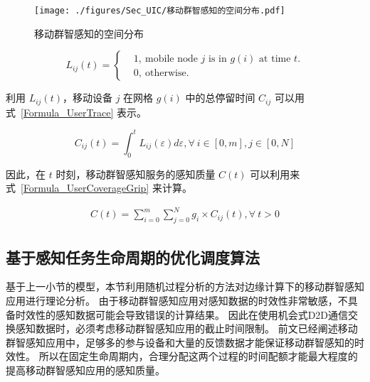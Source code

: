 \begin{figure}[!h]
  \centering
  \texttt{[image: ./figures/Sec\_UIC/移动群智感知的空间分布.pdf]}
  \vspace{-0.5em}
  \caption{移动群智感知的空间分布}
  \vspace{-0.5em}
  \label{Figure_CoverageofArea}
\end{figure}

\begin{equation}
  \label{Formula_LocationIJ}
  L_{ij}(t) = \left \{
  \begin{aligned}
  & 1,\ \text{mobile node $j$ is in $g(i)$ at time $t$.}\\
  & 0,\ \text{otherwise.}
  \end{aligned}
  \right.
\end{equation}

利用 $L_{ij}(t)$，移动设备 $j$ 在网格 $g(i)$ 中的总停留时间 $C_{ij}$ 可以用式~\eqref{Formula_UserTrace} 表示。

\begin{equation}
  \label{Formula_UserTrace}
  C_{ij}(t) = \int_{0}^{t}L_{ij}(\varepsilon )d\varepsilon , \forall \ i \in [0,m], j \in [0,N]
\end{equation}

因此，在 $t$ 时刻，移动群智感知服务的感知质量 $C(t)$ 可以利用来式~\eqref{Formula_UserCoverageGrip} 来计算。

\begin{equation}
  \label{Formula_UserCoverageGrip}
  \begin{gathered}
  C(t) = \sum^{m}_{i=0}\sum^{N}_{j=0} g_i \times C_{ij}(t), \forall \ t>0
  \end{gathered}
\end{equation}

\subsection{基于感知任务生命周期的优化调度算法}

基于上一小节的模型，本节利用随机过程分析的方法对边缘计算下的移动群智感知应用进行理论分析。
由于移动群智感知应用对感知数据的时效性非常敏感，不具备时效性的感知数据可能会导致错误的计算结果。
因此在使用机会式D2D通信交换感知数据时，必须考虑移动群智感知应用的截止时间限制。
前文已经阐述移动群智感知应用中，足够多的参与设备和大量的反馈数据才能保证移动群智感知的时效性。
所以在固定生命周期内，合理分配这两个过程的时间配额才能最大程度的提高移动群智感知应用的感知质量。

